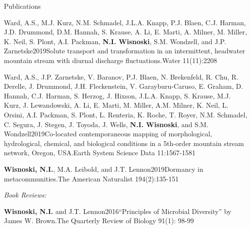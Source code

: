 \documentclass{resume} %
\begin{document}
\begin{rhangSection}{Publications}
\begin{Publication}{Ward, A.S., M.J. Kurz, N.M. Schmadel, J.L.A. Knapp, P.J. Blaen, C.J. Harman, J.D. Drummond, D.M. Hannah, S. Krause, A. Li, E. Marti, A. Milner, M. Miller, K. Neil, S. Plont, A.I. Packman, {\bf N.I. Wisnoski}, S.M. Wondzell, and J.P. Zarnetske}{2019}{Solute transport and transformation in an intermittent, headwater mountain stream with diurnal discharge fluctuations.}{Water 11(11):2208}
\end{Publication}

\begin{Publication}{Ward, A.S., J.P. Zarnetske, V. Baranov, P.J. Blaen, N. Brekenfeld, R. Chu, R. Derelle, J. Drummond, J.H. Fleckenstein, V. Garayburu-Caruso, E. Graham, D. Hannah, C.J. Harman, S. Herzog, J. Hixson, J.L.A. Knapp, S. Krause, M.J. Kurz, J. Lewandowski, A. Li, E. Marti, M. Miller, A.M. Milner, K. Neil, L. Orsini, A.I. Packman, S. Plont, L. Renteria, K. Roche, T. Royer, N.M. Schmadel, C. Segura, J. Stegen, J. Toyoda, J. Wells, {\bf N.I. Wisnoski}, and S.M. Wondzell}{2019}{Co-located contemporaneous mapping of morphological, hydrological, chemical, and biological conditions in a 5th-order mountain stream network, Oregon, USA.}{Earth System Science Data 11:1567-1581}
\end{Publication}

\begin{Publication}{{\bf Wisnoski, N.I.}, M.A. Leibold, and J.T. Lennon}{2019}{Dormancy in metacommunities.}{The American Naturalist 194(2):135-151}
\end{Publication}

\bigskip

{\it Book Reviews:}
\begin{Publication}{{\bf Wisnoski, N.I.} and J.T. Lennon}{2016}{\enquote{Principles of Microbial Diversity} by James W. Brown.}{The Quarterly Review of Biology 91(1): 98-99}
\end{Publication}

\end{rhangSection}

\bigskip

\end{document}
